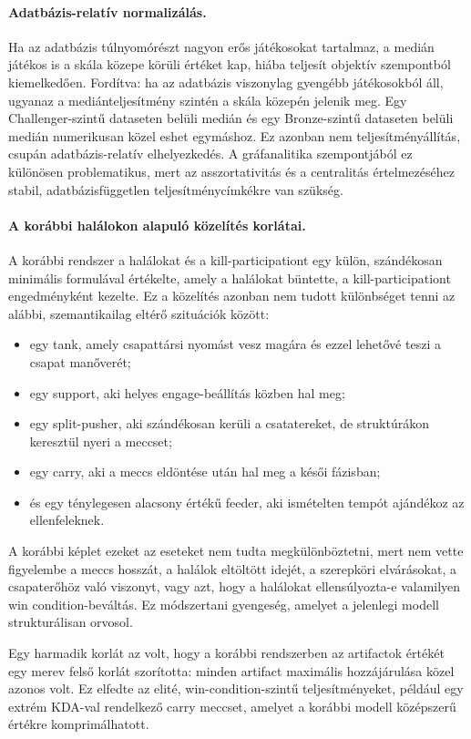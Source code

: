 \paragraph{Adatbázis-relatív normalizálás.}
Ha az adatbázis túlnyomórészt nagyon erős játékosokat tartalmaz, a medián játékos is a skála közepe körüli értéket kap, hiába teljesít objektív szempontból kiemelkedően. Fordítva: ha az adatbázis viszonylag gyengébb játékosokból áll, ugyanaz a mediánteljesítmény szintén a skála közepén jelenik meg. Egy Challenger-szintű dataseten belüli medián és egy Bronze-szintű dataseten belüli medián numerikusan közel eshet egymáshoz. Ez azonban nem teljesítményállítás, csupán adatbázis-relatív elhelyezkedés. A gráfanalitika szempontjából ez különösen problematikus, mert az asszortativitás és a centralitás értelmezéséhez stabil, adatbázisfüggetlen teljesítménycímkékre van szükség.

\paragraph{A korábbi halálokon alapuló közelítés korlátai.}
A korábbi rendszer a halálokat és a kill-participationt egy külön, szándékosan minimális formulával értékelte, amely a halálokat büntette, a kill-participationt engedményként kezelte. Ez a közelítés azonban nem tudott különbséget tenni az alábbi, szemantikailag eltérő szituációk között:
\begin{itemize}
    \item egy tank, amely csapattársi nyomást vesz magára és ezzel lehetővé teszi a csapat manőverét;
    \item egy support, aki helyes engage-beállítás közben hal meg;
    \item egy split-pusher, aki szándékosan kerüli a csatatereket, de struktúrákon keresztül nyeri a meccset;
    \item egy carry, aki a meccs eldöntése után hal meg a késői fázisban;
    \item és egy ténylegesen alacsony értékű feeder, aki ismételten tempót ajándékoz az ellenfeleknek.
\end{itemize}
A korábbi képlet ezeket az eseteket nem tudta megkülönböztetni, mert nem vette figyelembe a meccs hosszát, a halálok eltöltött idejét, a szerepköri elvárásokat, a csapaterőhöz való viszonyt, vagy azt, hogy a halálokat ellensúlyozta-e valamilyen win condition-beváltás. Ez módszertani gyengeség, amelyet a jelenlegi modell strukturálisan orvosol.

Egy harmadik korlát az volt, hogy a korábbi rendszerben az artifactok értékét egy merev felső korlát szorította: minden artifact maximális hozzájárulása közel azonos volt. Ez elfedte az elité, win-condition-szintű teljesítményeket, például egy extrém KDA-val rendelkező carry meccset, amelyet a korábbi modell középszerű értékre komprimálhatott.

